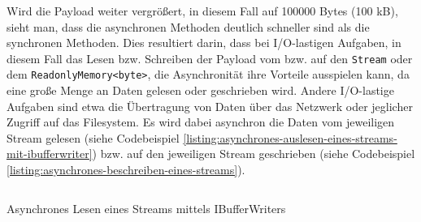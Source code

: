 \begin{table}[h]
    \caption{Benchmark mit 0 Options und mit einer Payload von 100000 Bytes}
    \label{tab:benchmark-0-100000}
\end{table}

Wird die Payload weiter vergrößert, in diesem Fall auf 100000 Bytes (100 kB), sieht man, dass die asynchronen Methoden deutlich schneller sind als die synchronen Methoden. Dies resultiert darin, dass bei I/O-lastigen Aufgaben, in diesem Fall das Lesen bzw. Schreiben der Payload vom bzw. auf den \texttt{Stream} oder dem \texttt{ReadonlyMemory<byte>}, die Asynchronität ihre Vorteile ausspielen kann, da eine große Menge an Daten gelesen oder geschrieben wird. Andere I/O-lastige Aufgaben sind etwa die Übertragung von Daten über das Netzwerk oder jeglicher Zugriff auf das Filesystem. Es wird dabei asynchron die Daten vom jeweiligen Stream gelesen (siehe Codebeispiel \ref{listing:asynchrones-auslesen-eines-streams-mit-ibufferwriter}) bzw. auf den jeweiligen Stream geschrieben (siehe Codebeispiel \ref{listing:asynchrones-beschreiben-eines-streams}).

\begin{listing}[h]
    \inputminted[framesep=2mm, baselinestretch=1.2, fontsize=\normalsize, linenos]{csharp}{codes/example_read_async_stream.cs}
    \caption{Asynchrones Lesen eines Streams mittels IBufferWriters}
    \label{listing:asynchrones-auslesen-eines-streams-mit-ibufferwriter}
\end{listing}

